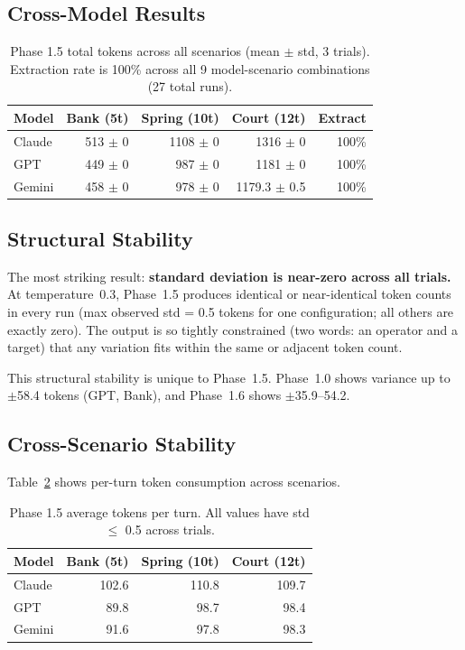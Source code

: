 \documentclass[11pt,a4paper]{article}
\begin{document}
\subsection{Cross-Model Results}

\begin{table}[ht]
\centering
\begin{tabular}{lrrrr}
\toprule
\textbf{Model} & \textbf{Bank (5t)} & \textbf{Spring (10t)} & \textbf{Court (12t)} & \textbf{Extract} \\
\midrule
Claude & 513 $\pm$ 0 & 1108 $\pm$ 0 & 1316 $\pm$ 0 & 100\% \\
GPT & 449 $\pm$ 0 & 987 $\pm$ 0 & 1181 $\pm$ 0 & 100\% \\
Gemini & 458 $\pm$ 0 & 978 $\pm$ 0 & 1179.3 $\pm$ 0.5 & 100\% \\
\bottomrule
\end{tabular}
\caption{Phase 1.5 total tokens across all scenarios (mean $\pm$ std, 3 trials).
Extraction rate is 100\% across all 9 model-scenario combinations (27 total runs).}
\label{tab:phase1_5}
\end{table}

\subsection{Structural Stability}

The most striking result: \textbf{standard deviation is near-zero across all trials.}
At temperature~0.3, Phase~1.5 produces identical or near-identical token counts in every
run (max observed std = 0.5 tokens for one configuration; all others are exactly zero).
The output is so tightly constrained (two words: an operator
and a target) that any variation fits within the same or adjacent token count.

This structural stability is unique to Phase~1.5. Phase~1.0 shows variance
up to $\pm$58.4 tokens (GPT, Bank), and Phase~1.6 shows $\pm$35.9--54.2.

\subsection{Cross-Scenario Stability}

Table~\ref{tab:phase1_5_avg} shows per-turn token consumption across scenarios.

\begin{table}[ht]
\centering
\begin{tabular}{lrrr}
\toprule
\textbf{Model} & \textbf{Bank (5t)} & \textbf{Spring (10t)} & \textbf{Court (12t)} \\
\midrule
Claude & 102.6 & 110.8 & 109.7 \\
GPT & 89.8 & 98.7 & 98.4 \\
Gemini & 91.6 & 97.8 & 98.3 \\
\bottomrule
\end{tabular}
\caption{Phase 1.5 average tokens per turn. All values have std $\leq$ 0.5 across trials.}
\label{tab:phase1_5_avg}
\end{table}
\end{document}
